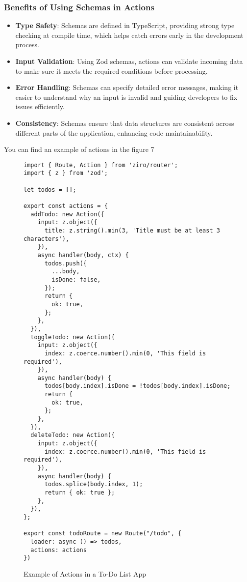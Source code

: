 \subsubsection*{Benefits of Using Schemas in Actions}

\begin{itemize}
  \item \textbf{Type Safety}: Schemas are defined in TypeScript, providing strong type checking at compile time, which helps catch errors early in the development process.

  \item \textbf{Input Validation}: Using Zod schemas, actions can validate incoming data to make sure it meets the required conditions before processing.

  \item \textbf{Error Handling}: Schemas can specify detailed error messages, making it easier to understand why an input is invalid and guiding developers to fix issues efficiently.

  \item \textbf{Consistency}: Schemas ensure that data structures are consistent across different parts of the application, enhancing code maintainability.
\end{itemize}

You can find an example of actions in the figure 7

\begin{figure}[h!]
\begin{verbatim}
import { Route, Action } from 'ziro/router';
import { z } from 'zod';

let todos = [];

export const actions = {
  addTodo: new Action({
    input: z.object({
      title: z.string().min(3, 'Title must be at least 3 characters'),
    }),
    async handler(body, ctx) {
      todos.push({
        ...body,
        isDone: false,
      });
      return {
        ok: true,
      };
    },
  }),
  toggleTodo: new Action({
    input: z.object({
      index: z.coerce.number().min(0, 'This field is required'),
    }),
    async handler(body) {
      todos[body.index].isDone = !todos[body.index].isDone;
      return {
        ok: true,
      };
    },
  }),
  deleteTodo: new Action({
    input: z.object({
      index: z.coerce.number().min(0, 'This field is required'),
    }),
    async handler(body) {
      todos.splice(body.index, 1);
      return { ok: true };
    },
  }),
};

export const todoRoute = new Route("/todo", {
  loader: async () => todos,
  actions: actions
})
\end{verbatim}
\caption{Example of Actions in a To-Do List App}
\end{figure}
\pagebreak

